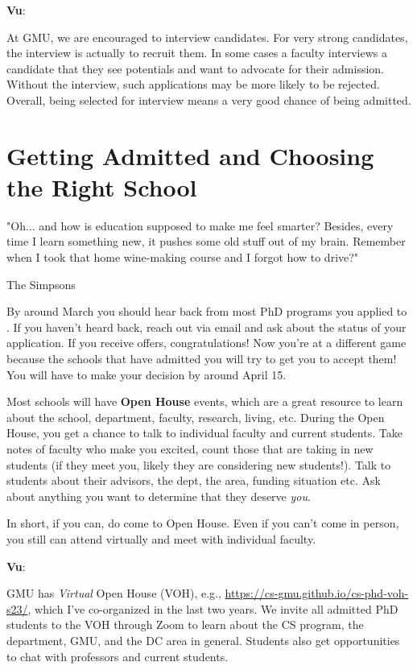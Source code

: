 \documentclass[11pt]{article}
\newenvironment{commentbox}[1][]{
\small
    \begin{cbox}
    \textbf{#1}: 
 }{
   \end{cbox}
}
\begin{document}
\begin{commentbox}[Vu]
At GMU, we are encouraged to interview candidates. For very strong candidates, the interview is actually to recruit them.  In some cases a faculty interviews a candidate that they see potentials and want to advocate for their admission. Without the interview, such applications may be more likely to be rejected. Overall, being selected for interview means a very good chance of being admitted.
\end{commentbox}

\section{Getting Admitted and Choosing the Right School}

\epigraph{"Oh... and how is education supposed to make me feel smarter? Besides, every time I learn something new, it pushes some old stuff out of my brain. Remember when I took that home wine-making course and I forgot how to drive?"}{The Simpsons}

By around March you should hear back from most PhD programs you applied to . If you haven't heard back, reach out via email and ask about the status of your application.
If you receive offers, congratulations!  Now you're at a different game because the schools that have admitted you will try to get you to accept them!   You will have to make your decision by around April 15.

Most schools will have \textbf{Open House} events, which are a great resource to learn about the school, department, faculty, research, living, etc. During the Open House, you get a chance to talk to individual faculty and current students.  Take notes of faculty who make you excited, count those that are taking in new students (if they meet you, likely they are considering new students!).  Talk to students about their advisors, the dept, the area, funding situation etc.  Ask about anything you want to determine that they deserve \emph{you}.

In short, if you can, do come to Open House.  Even if you can't come in person, you still can attend virtually and meet with individual faculty.

\begin{commentbox}[Vu]
GMU has \emph{Virtual} Open House (VOH), e.g., \url{https://cs-gmu.github.io/cs-phd-voh-s23/}, which I've co-organized in the last two years. We invite all admitted PhD students to the VOH through Zoom to learn about the CS program, the department, GMU, and the DC area in general. Students also get opportunities to chat with professors and current students.
\end{commentbox}
\end{document}
